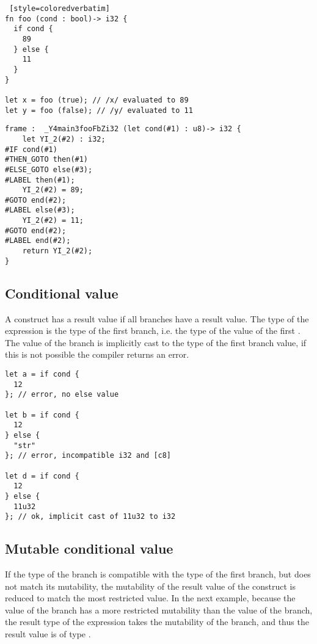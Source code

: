 \begin{lstlisting} [style=coloredverbatim]
fn foo (cond : bool)-> i32 {
  if cond {
    89
  } else {
    11
  }
}

let x = foo (true); // /x/ evaluated to 89
let y = foo (false); // /y/ evaluated to 11
\end{lstlisting}



\begin{lstlisting}[style=intermediateVerb, caption=Simple condition, label=lst:if_cond_simple]
frame :  _Y4main3fooFbZi32 (let cond(#1) : u8)-> i32 {
    let YI_2(#2) : i32;
#IF cond(#1)
#THEN_GOTO then(#1)
#ELSE_GOTO else(#3);
#LABEL then(#1);
    YI_2(#2) = 89;
#GOTO end(#2);
#LABEL else(#3);
    YI_2(#2) = 11;
#GOTO end(#2);
#LABEL end(#2);
    return YI_2(#2);
}
\end{lstlisting}



\subsection {Conditional value}

A  construct has a result value if all branches have a result value.
The type of the expression is the type of the first branch, i.e. the type of the
value of the first . The value of the  branch is
implicitly cast to the type of the first branch value, if this is not possible
the compiler returns an error.

\begin{lstlisting}[style=coloredverbatim]
let a = if cond {
  12
}; // error, no else value

let b = if cond {
  12
} else {
  "str"
}; // error, incompatible i32 and [c8]

let d = if cond {
  12
} else {
  11u32
}; // ok, implicit cast of 11u32 to i32
\end{lstlisting}

\subsection{Mutable conditional value}

If the type of the  branch is compatible with the type of the first
branch, but does not match its mutability, the mutability of the result value of
the  construct is reduced to match the most restricted value. In the
next example, because the value of the  branch has a more
restricted mutability than the value of the  branch, the result type
of the expression takes the mutability of the  branch, and thus the
result value is of type .

